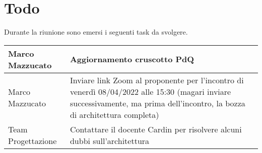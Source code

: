 \section{Todo}
Durante la riunione sono emersi i seguenti task da svolgere.

\begin{center}
  \begin{tabular}{|p{5cm}|p{7cm}|}
    \hline
    Marco Mazzucato & Aggiornamento cruscotto PdQ  \\ \hline
    Marco Mazzucato & Inviare link Zoom al proponente per l'incontro di venerdì 08/04/2022 alle 15:30 (magari inviare successivamente, ma prima dell'incontro, la bozza di architettura completa)  \\ \hline
    Team Progettazione & Contattare il docente Cardin per risolvere alcuni dubbi sull'architettura \\ \hline
  \end{tabular}
\end{center}
